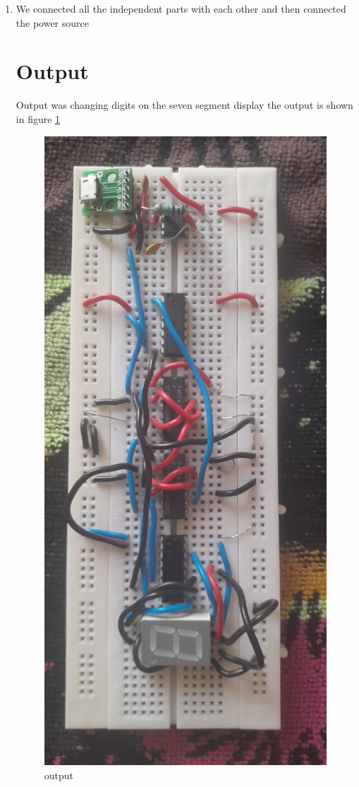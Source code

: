 \documentclass[journal,12pt,twocolumn]{IEEEtran}
\begin{document}
\begin{enumerate}
	\item We connected all the independent parts with each other and then connected the power source
	
	
	
	
	
\section*{Output} 
	Output was changing digits on the seven segment display the output is shown in figure \ref{output}
	\begin{figure}[h]
		\includegraphics[width=\linewidth]{images/output.jpeg}
		\caption{output}
		\label{output}
	\end{figure}
	
\end{enumerate}
\end{document}
